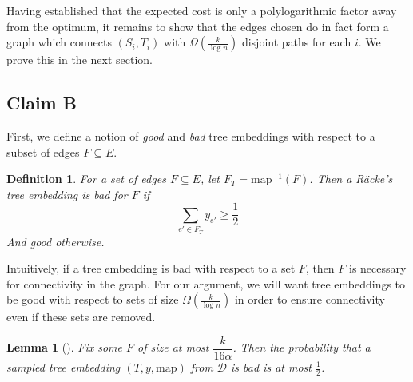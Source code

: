 \documentclass[12pt]{article}
\newtheorem{definition}{Definition}
\newtheorem{lemma}{Lemma}
\begin{document}
%

Having established that the expected cost is only a polylogarithmic factor away from the optimum, it remains to show that the edges chosen do in fact form a graph which connects $(S_i, T_i)$ with $\Omega(\frac{k}{\log n})$ disjoint paths for each $i$. We prove this in the next section.

\subsection{Claim B}

First, we define a notion of \emph{good} and \emph{bad} tree embeddings with respect to a subset of edges $F \subseteq E$.


\begin{definition}
For a set of edges $F \subseteq E$, let $F_T = \text{map}^{-1}(F)$. Then a R\"{a}cke's tree embedding is bad for $F$ if 
\[ \sum_{e' \in F_T} y_{e'} \geq \frac{1}{2} \]
And good otherwise.
\end{definition}

Intuitively, if a tree embedding is bad with respect to a set $F$, then $F$ is necessary for connectivity in the graph. For our argument, we will want tree embeddings to be good with respect to sets of size $\Omega(\frac{k}{\log n})$ in order to ensure connectivity even if these sets are removed.

\begin{lemma}[\cite{ssc}]
\label{lem:notbad}
Fix some $F$ of size at most $\dfrac{k}{16 \alpha}$. Then the probability that a sampled tree embedding $(T, y, \text{map})$ from $\mathcal{D}$ is bad is at most $\frac{1}{2}$. 
\end{lemma} 
\end{document}
